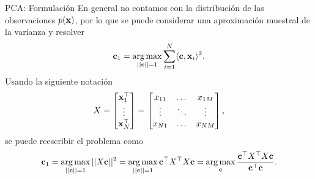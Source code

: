 \documentclass[9pt, handout]{beamer}
\begin{document}
\begin{frame}{PCA: Formulación}
En general no contamos con la distribución de las observaciones $p(\mathbf{x})$, por lo que se puede considerar una aproximación muestral de la varianza y resolver 
\begin{align*}
	\mathbf{c}_1 = \operatorname*{arg\,max}_{||\mathbf{c}||=1} \sum_{i=1}^N \langle\mathbf{c},\mathbf{x}_i\rangle^2.\label{eq:PCA_max2}
\end{align*} \pause
Usando la siguiente notación
$$
X=\begin{bmatrix}
        \mathbf{x}_1^\top\\
        \vdots\\
        \mathbf{x}_N^\top\\
        \end{bmatrix}=
        \begin{bmatrix}
        {x}_{11}    & \dots & {x}_{1M}  \\
        \vdots          & \ddots& \vdots        \\
        {x}_{N1}    & \dots & {x}_{NM}
        \end{bmatrix},
$$
\pause
se puede reescribir el problema como
\begin{equation*}
	\mathbf{c}_1 = \operatorname*{arg\,max}_{||\mathbf{c}||=1} ||X\mathbf{c}||^2 
			= \operatorname*{arg\,max}_{||\mathbf{c}||=1} \mathbf{c}^\top X^\top X \mathbf{c}
			= \operatorname*{arg\,max}_{\mathbf{c}} \frac{\mathbf{c}^\top X^\top X \mathbf{c}}{\mathbf{c}^\top \mathbf{c}}.
			\label{eq:PCA_max3}
\end{equation*}

\end{frame}
\end{document}
